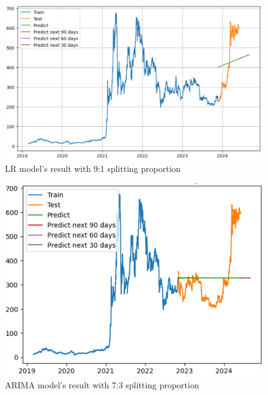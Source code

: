 \documentclass{ieeeojies}
\begin{document}
\begin{figure}[H]
	\centering
	\begin{minipage}{0.6\linewidth}
		\centering
		\includegraphics[width=\linewidth]{bibliography/Images/LR_BNB_91.PNG}
		\caption{LR model's result with 9:1 splitting proportion}
	\end{minipage}
\end{figure}
\begin{figure}[H]
	\centering
	\begin{minipage}{0.6\linewidth}
		\centering
		\includegraphics[width=\linewidth]{bibliography/Images/ARIMA_BNB_73.PNG}
		\caption{ARIMA model's result with 7:3 splitting proportion}
	\end{minipage}
\end{figure}
\end{document}
